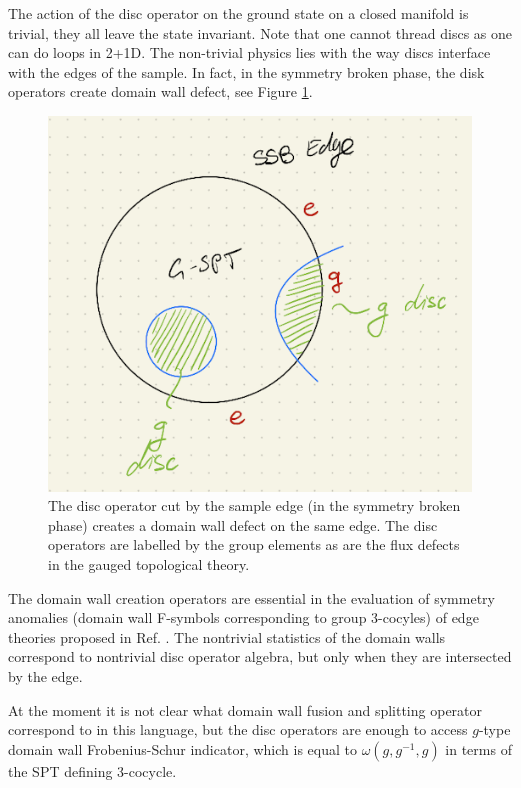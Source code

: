 \documentclass[a4paper,twocolumn,11pt]{quantumarticle}
\begin{document}
The action of the disc operator on the ground state on a closed manifold is trivial, they all leave the state invariant. Note that one cannot thread discs as one can do loops in 2+1D. The non-trivial physics lies with the way discs interface with the edges of the sample. In fact, in the symmetry broken phase, the disk operators create domain wall defect, see Figure \ref{fig:disc_domain}. \begin{figure}
\centering
\includegraphics[width=\linewidth]{Figures/disc_domain_wall.png}
\caption{The disc operator cut by the sample edge (in the symmetry broken phase) creates a domain wall defect on the same edge. The disc operators are labelled by the group elements as are the flux defects in the gauged topological theory.}
\label{fig:disc_domain}
\end{figure}

The domain wall creation operators are essential in the evaluation of symmetry anomalies (domain wall F-symbols corresponding to group 3-cocyles) of edge theories proposed in Ref. \cite{Kawagoe_2021}. The nontrivial statistics of the domain walls correspond to nontrivial disc operator algebra, but only when they are intersected by the edge.

At the moment it is not clear what domain wall fusion and splitting operator correspond to in this language, but the disc operators are enough to access $g$-type domain wall Frobenius-Schur indicator, which is equal to $\omega(g, g^{-1}, g)$ in terms of the SPT defining 3-cocycle.
\end{document}
